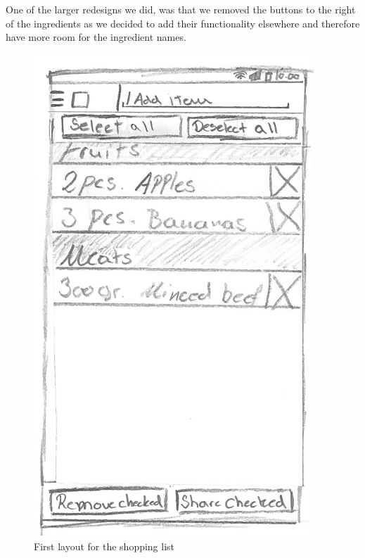 One of the larger redesigns we did, was that we removed the buttons to the right of the ingredients as we decided to add their functionality elsewhere and therefore have more room for the ingredient names.

\begin{figure}[H]
\begin{minipage}[b]{0.5\columnwidth}
\centering
\includegraphics[width=0.7\columnwidth]{img/prototypes/shopping_list_old.pdf}
\caption{First layout for the shopping list\label{fig:shoppingold}}
\end{minipage}
\hspace{0.5cm}
\begin{minipage}[b]{0.5\columnwidth}
\centering

\end{minipage}
\end{figure}
